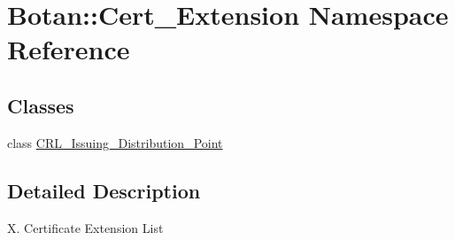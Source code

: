 \hypertarget{namespace_botan_1_1_cert___extension}{}\section{Botan\+:\+:Cert\+\_\+\+Extension Namespace Reference}
\label{namespace_botan_1_1_cert___extension}
\subsection*{Classes}
\begin{DoxyCompactItemize}
\item 
class \mbox{\hyperlink{class_botan_1_1_cert___extension_1_1_c_r_l___issuing___distribution___point}{C\+R\+L\+\_\+\+Issuing\+\_\+\+Distribution\+\_\+\+Point}}
\end{DoxyCompactItemize}


\subsection{Detailed Description}
X. Certificate Extension List 